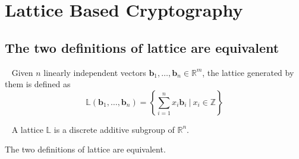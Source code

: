 
\chapter{Lattice Based Cryptography}
\section{The two definitions of lattice are equivalent}
\begin{definition}[Lattice]~\label{lattice1}
Given $n$ linearly independent vectors $\mathbf{b}_1, \ldots, \mathbf{b}_n \in \mathbb{R}^m$, the lattice generated by them is defined as
$$
\mathbb{L}(\mathbf{b}_1, \ldots, \mathbf{b}_n) = \left\{ \sum_{i=1}^{n} x_i \mathbf{b}_i \ \bigg| \ x_i \in \mathbb{Z} \right\}
$$
\end{definition}
\begin{definition}~\label{lattice2}
    A lattice $\mathbb{L}$ is a discrete additive subgroup of $\mathbb{R}^n$.
\end{definition}
\begin{theorem}
        The two definitions of lattice are equivalent.
\end{theorem}
